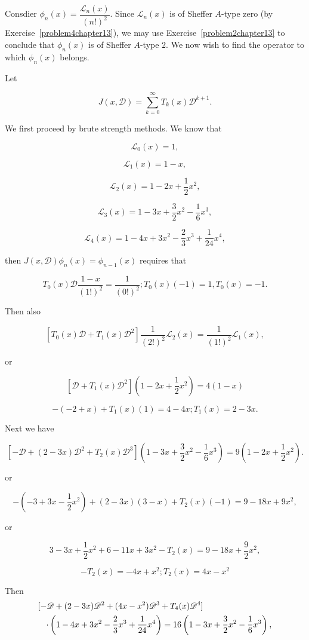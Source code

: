 \begin{solution}
Consdier $\phi_n(x) = \dfrac{\mathscr{L}_n(x)}{(n!)^2}$. Since $\mathscr{L}_n(x)$ is of Sheffer $A$-type zero (by Exercise~\ref{problem4chapter13}), we may use Exercise~\ref{problem2chapter13} to conclude that $\phi_n(x)$ is of Sheffer $A$-type $2$. We now wish to find the operator to which $\phi_n(x)$ belongs.

Let

$$J(x, \mathscr{D}) = \displaystyle\sum_{k=0}^{\infty} T_k(x) \mathscr{D}^{k+1}.$$

We first proceed by brute strength methods. We know that

$$\mathscr{L}_0(x)=1,$$

$$\mathscr{L}_1(x) = 1-x,$$

$$\mathscr{L}_2(x) = 1-2x+\dfrac{1}{2}x^2,$$

$$\mathscr{L}_3(x) = 1-3x+\dfrac{3}{2}x^2 - \dfrac{1}{6}x^3,$$

$$\mathscr{L}_4(x) = 1-4x+3x^2-\dfrac{2}{3}x^3+\dfrac{1}{24}x^4,$$

then $J(x,\mathscr{D}) \phi_n(x) = \phi_{n-1}(x)$ requires that

$$T_0(x) \mathscr{D} \dfrac{1-x}{(1!)^2} = \dfrac{1}{(0!)^2}; T_0(x)(-1)=1, T_0(x)=-1.$$

Then also

$$[T_0(x) \mathscr{D} + T_1(x) \mathscr{D}^2 ] \dfrac{1}{(2!)^2} \mathscr{L}_2(x) = \dfrac{1}{(1!)^2} \mathscr{L}_1(x),$$

or

$$[\mathscr{D}+ T_1(x) \mathscr{D}^2] \left(1-2x+\dfrac{1}{2}x^2 \right) = 4(1-x)$$

$$-(-2+x)+T_1(x)(1) = 4-4x; T_1(x) = 2-3x.$$

Next we have

$$[-\mathscr{D} + (2-3x)\mathscr{D}^2 + T_2(x)\mathscr{D}^3]\left(1-3x+\dfrac{3}{2} x^2- \dfrac{1}{6}x^3 \right) = 9 \left(1-2x+\dfrac{1}{2}x^2 \right).$$

or

$$-\left(-3+3x-\dfrac{1}{2}x^2 \right) + (2-3x)(3-x) + T_2(x)(-1) = 9-18x+9x^2,$$

or

$$3-3x + \dfrac{1}{2}x^2 + 6-11x + 3x^2 - T_2(x) = 9-18x + \dfrac{9}{2}x^2,$$

$$-T_2(x) = -4x+x^2; T_2(x)=4x-x^2$$

Then
\begin{eqnarray*}
\lefteqn{[-\mathscr{D} + (2-3x)\mathscr{D}^2 + (4x-x^2) \mathscr{D}^3 + T_4(x) \mathscr{D}^4]} \\
& & \cdot\left(1-4x+3x^2-\dfrac{2}{3}x^3 + \dfrac{1}{24}x^4 \right)  = 16 \left( 1-3x + \dfrac{3}{2} x^2 - \dfrac{1}{6} x^3 \right),
\end{eqnarray*}


\end{solution}
